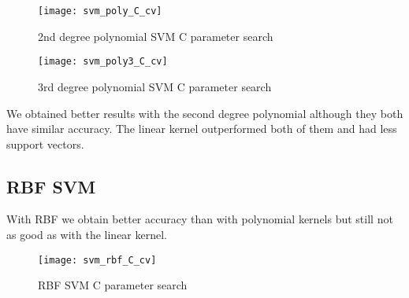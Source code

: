 \begin{figure}[H]
    \centering
    \texttt{[image: svm\_poly\_C\_cv]}
    \caption{2nd degree polynomial SVM C parameter search}%
    \label{fig:svm_poly_C_cv}
\end{figure}

\pagebreak
{}

\begin{figure}[H]
    \centering
    \texttt{[image: svm\_poly3\_C\_cv]}
    \caption{3rd degree polynomial SVM C parameter search}%
    \label{fig:svm_poly3_C_cv}
\end{figure}

We obtained better results with the second degree polynomial although they both have similar accuracy. The linear kernel outperformed both of them and had less support vectors.


\pagebreak
\subsection{RBF SVM}

With RBF we obtain better accuracy than with polynomial kernels but still not as good as with the linear kernel.


\begin{figure}[H]
    \centering
    \texttt{[image: svm\_rbf\_C\_cv]}
    \caption{RBF SVM C parameter search}%
    \label{fig:svm_rbf_C_cv}
\end{figure}

